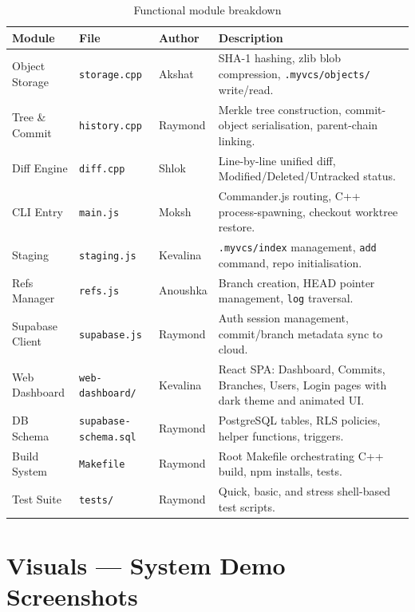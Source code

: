 \documentclass{article}
\begin{document}
\begin{table}[htbp]
\centering
\renewcommand{\arraystretch}{1.4}
\begin{tabular}{l l l p{5.5cm}}
\toprule
Module & File & Author & Description \\
\midrule
Object Storage  & \texttt{storage.cpp}   & Akshat    &
    SHA-1 hashing, zlib blob compression, \texttt{.myvcs/objects/}
    write/read. \\
Tree \& Commit  & \texttt{history.cpp}   & Raymond   &
    Merkle tree construction, commit-object serialisation, parent-chain
    linking. \\
Diff Engine     & \texttt{diff.cpp}      & Shlok     &
    Line-by-line unified diff, Modified/Deleted/Untracked status. \\
CLI Entry       & \texttt{main.js}       & Moksh     &
    Commander.js routing, C++ process-spawning, checkout worktree
    restore. \\
Staging         & \texttt{staging.js}    & Kevalina  &
    \texttt{.myvcs/index} management, \texttt{add} command, repo
    initialisation. \\
Refs Manager    & \texttt{refs.js}       & Anoushka  &
    Branch creation, HEAD pointer management, \texttt{log} traversal. \\
Supabase Client & \texttt{supabase.js}   & Raymond   &
    Auth session management, commit/branch metadata sync to cloud. \\
Web Dashboard   & \texttt{web-dashboard/} & Kevalina &
    React SPA: Dashboard, Commits, Branches, Users, Login pages with
    dark theme and animated UI. \\
DB Schema       & \texttt{supabase-schema.sql} & Raymond &
    PostgreSQL tables, RLS policies, helper functions, triggers. \\
Build System    & \texttt{Makefile}      & Raymond   &
    Root Makefile orchestrating C++ build, npm installs, tests. \\
Test Suite      & \texttt{tests/}        & Raymond   &
    Quick, basic, and stress shell-based test scripts. \\
\bottomrule
\end{tabular}
\caption{Functional module breakdown}
\label{tab:modules}
\end{table}

\section{Visuals --- System Demo Screenshots}
\end{document}

